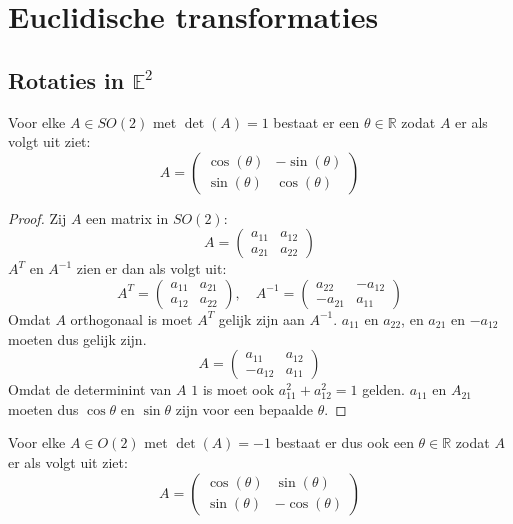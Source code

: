\documentclass[main.tex]{subfiles}
\begin{document}
\chapter{Euclidische transformaties}
\label{cha:euclidische-transformaties}

\section{Rotaties in $\mathbb{E}^{2}$}
\label{sec:roties-in-e2}

\begin{lem}
  Voor elke $A\in SO(2)$ met $\det(A)=1$ bestaat er een $\theta\in \mathbb{R}$ zodat $A$ er als volgt uit ziet:
  \[
  A =
  \begin{pmatrix}
    \cos(\theta) & -\sin(\theta)\\
    \sin(\theta) & \cos(\theta)
  \end{pmatrix}
  \]

  \begin{proof}
    Zij $A$ een matrix in $SO(2)$:
    \[
    A =
    \begin{pmatrix}
      a_{11} & a_{12}\\
      a_{21} & a_{22}
    \end{pmatrix}
    \]
    $A^{T}$ en $A^{-1}$ zien er dan als volgt uit:
    \[
    A^{T} =
    \begin{pmatrix}
      a_{11} & a_{21}\\
      a_{12} & a_{22}
    \end{pmatrix}
    ,\quad
    A^{-1} = 
    \begin{pmatrix}
      a_{22} & -a_{12}\\
      -a_{21} & a_{11}
    \end{pmatrix}
    \]
    Omdat $A$ orthogonaal is moet $A^{T}$ gelijk zijn aan $A^{-1}$.
    $a_{11}$ en $a_{22}$, en $a_{21}$ en $-a_{12}$ moeten dus gelijk zijn.
    \[ 
    A = 
    \begin{pmatrix}
      a_{11} & a_{12}\\
      -a_{12} & a_{11}
    \end{pmatrix}
    \]
    Omdat de determinint van $A$ $1$ is moet ook $a_{11}^{2} + a_{12}^{2}=1$ gelden.
    $a_{11}$ en $A_{21}$ moeten dus $\cos\theta$ en $\sin\theta$ zijn voor een bepaalde $\theta$.
  \end{proof}
\end{lem}

\begin{opm}
  Voor elke $A\in O(2)$ met $\det(A) =-1$ bestaat er dus ook een $\theta\in \mathbb{R}$ zodat $A$ er als volgt uit ziet:
  \[
  A =
  \begin{pmatrix}
    \cos(\theta) & \sin(\theta)\\
    \sin(\theta) & -\cos(\theta)
  \end{pmatrix}
  \]
\end{opm}
\end{document}
